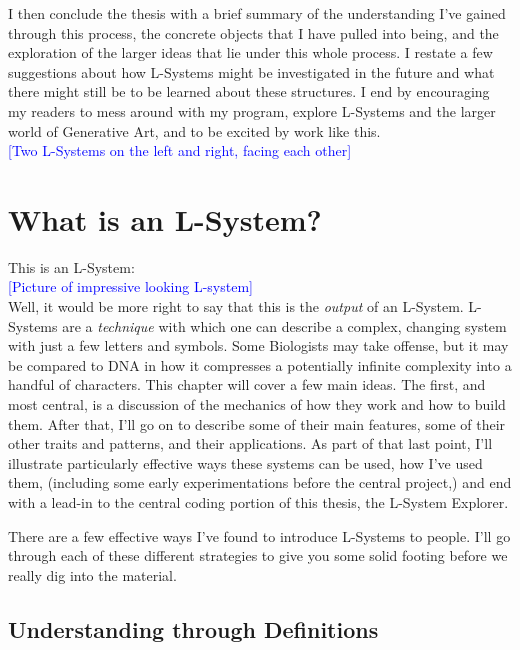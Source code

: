 \documentclass[12pt,twoside]{reedthesis}
\begin{document}
	I then conclude the thesis with a brief summary of the understanding I've gained through this process, the concrete objects that I have pulled into being, and the exploration of the larger ideas that lie under this whole process. I restate a few suggestions about how L-Systems might be investigated in the future and what there might still be to be learned about these structures. I end by encouraging my readers to mess around with my program, explore L-Systems and the larger world of Generative Art, and to be excited by work like this.\\
	
	\textcolor{blue}{[Two L-Systems on the left and right, facing each other]}
	
\chapter{What is an L-System?}

This is an L-System:\\

\textcolor{blue}{[Picture of impressive looking L-system]}\\

	Well, it would be more right to say that this is the \textit{output} of an L-System. L-Systems are a \textit{technique} with which one can describe a complex, changing system with just a few letters and symbols. Some Biologists may take offense, but it may be compared to DNA in how it compresses a potentially infinite complexity into a handful of characters. This chapter will cover a few main ideas. The first, and most central, is a discussion of the mechanics of how they work and how to build them. After that, I’ll go on to describe some of their main features, some of their other traits and patterns, and their applications. As part of that last point, I’ll illustrate particularly effective ways these systems can be used, how I’ve used them, (including some early experimentations before the central project,) and end with a lead-in to the central coding portion of this thesis, the L-System Explorer.

	There are a few effective ways I've found to introduce L-Systems to people. I'll go through each of these different strategies to give you some solid footing before we really dig into the material.


\section{Understanding through Definitions}
\end{document}
